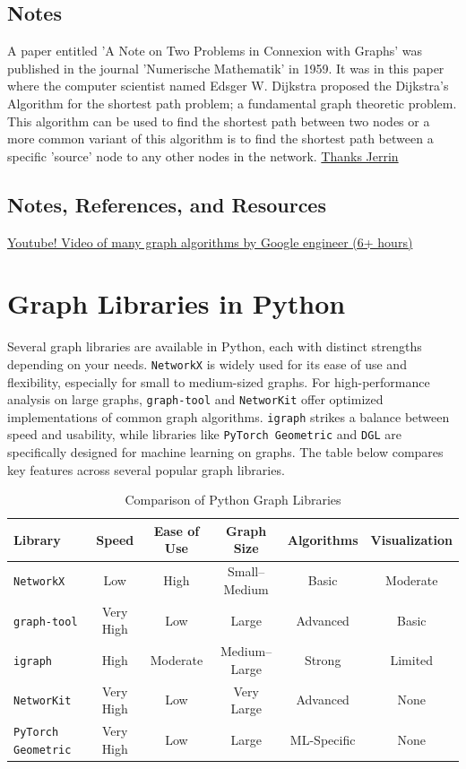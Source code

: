 \fi


\subsection{Notes}

A paper entitled 'A Note on Two Problems in Connexion with Graphs' was published in the journal 'Numerische Mathematik' in 1959. It was in this paper where the computer scientist named Edsger W. Dijkstra proposed the Dijkstra's Algorithm for the shortest path problem; a fundamental graph theoretic problem. This algorithm can be used to find the shortest path between two nodes or a more common variant of this algorithm is to find the shortest path between a specific 'source' node to any other nodes in the network. \href{https://www.overleaf.com/project/62472837411e2ce1b881337f}{Thanks Jerrin}

\subsection*{Notes, References, and Resources}
\begin{resource}
\href{https://www.youtube.com/watch?v=09_LlHjoEiY}{Youtube!  Video of many graph algorithms by Google engineer (6+ hours)}
\end{resource}


\section*{Graph Libraries in Python}

Several graph libraries are available in Python, each with distinct strengths depending on your needs. \texttt{NetworkX} is widely used for its ease of use and flexibility, especially for small to medium-sized graphs. For high-performance analysis on large graphs, \texttt{graph-tool} and \texttt{NetworKit} offer optimized implementations of common graph algorithms. \texttt{igraph} strikes a balance between speed and usability, while libraries like \texttt{PyTorch Geometric} and \texttt{DGL} are specifically designed for machine learning on graphs. The table below compares key features across several popular graph libraries.

\begin{table}[h!]
\centering
\begin{tabular}{@{}lccccc@{}}
\toprule
\textbf{Library} & \textbf{Speed} & \textbf{Ease of Use} & \textbf{Graph Size} & \textbf{Algorithms} & \textbf{Visualization} \\
\midrule
\texttt{NetworkX} & Low & High & Small–Medium & Basic & Moderate \\
\texttt{graph-tool} & Very High & Low & Large & Advanced & Basic \\
\texttt{igraph} & High & Moderate & Medium–Large & Strong & Limited \\
\texttt{NetworKit} & Very High & Low & Very Large & Advanced & None \\
\texttt{PyTorch Geometric} & Very High & Low & Large & ML-Specific & None \\
\bottomrule
\end{tabular}
\caption{Comparison of Python Graph Libraries}
\end{table}